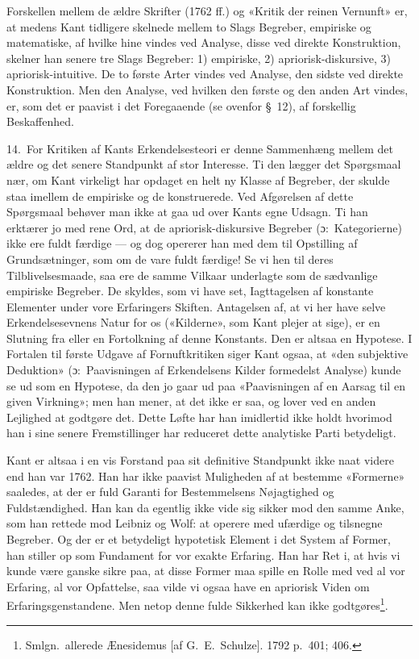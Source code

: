 \documentclass[12pt,a4paper]{article}
\newcommand{\apage}[1]{\marginnote{\footnotesize\textit{[#1]}}}
\begin{document}
Forskellen mellem de ældre Skrifter (1762 ff.) og «Kritik der reinen
Vernunft» er, at medens Kant tidligere skelnede mellem to Slags Begreber,
empiriske og matematiske, af hvilke hine vindes ved Analyse, disse ved
direkte Konstruktion, skelner han senere tre Slags Begreber: 1)
empiriske, 2) apriorisk-diskursive, 3) apriorisk-intuitive. De to første
Arter vindes ved Analyse, den sidste ved direkte Konstruktion. Men den
Analyse, ved hvilken den første og den anden Art vindes, er, som det er
paavist i det Foregaaende (se ovenfor §\ 12), af forskellig Beskaffenhed.

14.\ For Kritiken af Kants Erkendelsesteori er denne Sammenhæng mellem
det ældre og det senere Standpunkt af stor Interesse. Ti den lægger det
Spørgsmaal nær, om Kant virkeligt har opdaget en helt ny Klasse af
Begreber, der skulde staa imellem de empiriske og de konstruerede. Ved
Afgørelsen af dette Spørgsmaal behøver man ikke at gaa ud over Kants egne
Udsagn. Ti han erktærer jo med rene Ord, at de apriorisk-diskursive
Begreber (ɔ:\ Kategorierne) ikke ere fuldt færdige --- og dog opererer
han med dem til Opstilling af Grundsætninger, som om de vare fuldt
færdige! Se vi hen til deres Tilblivelsesmaade, saa ere de samme Vilkaar
underlagte som de sædvanlige empiriske Begreber. De skyldes, som vi have
set, Iagttagelsen af konstante Elementer under vore Erfaringers Skiften.
Antagelsen af, at vi her have selve Erkendelsesevnens Natur for os
(«Kilderne», som Kant plejer at sige), er en Slutning fra eller en
Fortolkning af denne Konstants. Den er altsaa en Hypotese. I Fortalen til
første Udgave af Fornuftkritiken siger Kant ogsaa, at «den subjektive
Deduktion» (ɔ:\ Paavisningen af Erkendelsens Kilder formedelst Analyse)
kunde se ud som en Hypotese, da den jo gaar ud paa «Paavisningen af en
Aarsag til en given Virkning»; men han mener, at det ikke er saa, og
lover ved en anden Lejlighed at godtgøre det. Dette Løfte har han
imidlertid ikke holdt hvorimod han i sine senere Fremstillinger har
reduceret dette analytiske Parti betydeligt.

Kant er altsaa i en vis Forstand paa sit definitive Standpunkt ikke naat
videre end \apage{30} han var 1762. Han har ikke paavist Muligheden af at bestemme
«Formerne» saaledes, at der er fuld Garanti for Bestemmelsens Nøjagtighed
og Fuldstændighed. Han kan da egentlig ikke vide sig sikker mod den samme
Anke, som han rettede mod Leibniz og Wolf: at operere med ufærdige og
tilsnegne Begreber. Og der er et betydeligt hypotetisk Element i det
System af Former, han stiller op som Fundament for vor exakte Erfaring.
Han har Ret i, at hvis vi kunde være ganske sikre paa, at disse Former
maa spille en Rolle med ved al vor Erfaring, al vor Opfattelse, saa vilde
vi ogsaa have en apriorisk Viden om Erfaringsgenstandene. Men netop denne
fulde Sikkerhed kan ikke godtgøres\footnote{Smlgn.\ allerede Ænesidemus [af G.\ E.\ Schulze].
1792 p.\ 401; 406.}.
\end{document}
